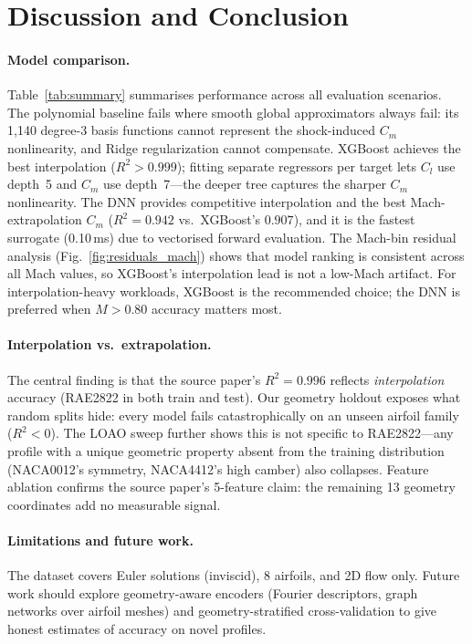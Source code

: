 \documentclass[11pt]{article}
\begin{document}
\section{Discussion and Conclusion}

\paragraph{Model comparison.}
Table~\ref{tab:summary} summarises performance across all evaluation scenarios.
The polynomial baseline fails where smooth global approximators always fail: its
1,140 degree-3 basis functions cannot represent the shock-induced $C_m$
nonlinearity, and Ridge regularization cannot compensate. XGBoost achieves the
best interpolation ($R^2>0.999$); fitting separate regressors per target lets
$C_l$ use depth~5 and $C_m$ use depth~7---the deeper tree captures the
sharper $C_m$ nonlinearity. The DNN provides competitive interpolation and the best Mach-extrapolation
$C_m$ ($R^2=0.942$ vs.\ XGBoost's $0.907$), and it is the fastest surrogate
(0.10\,ms) due to vectorised forward evaluation. The Mach-bin residual
analysis (Fig.~\ref{fig:residuals_mach}) shows that model ranking is
consistent across all Mach values, so XGBoost's interpolation lead is not a
low-Mach artifact. For interpolation-heavy workloads, XGBoost is the
recommended choice; the DNN is preferred when $M>0.80$ accuracy matters most.

\paragraph{Interpolation vs.\ extrapolation.}
The central finding is that the source paper's $R^2=0.996$ reflects
\emph{interpolation} accuracy (RAE2822 in both train and test). Our geometry
holdout exposes what random splits hide: every model fails catastrophically on
an unseen airfoil family ($R^2 < 0$). The LOAO sweep further shows this is
not specific to RAE2822---any profile with a unique geometric property absent
from the training distribution (NACA0012's symmetry, NACA4412's high camber)
also collapses. Feature ablation confirms the source paper's 5-feature claim:
the remaining 13 geometry coordinates add no measurable signal.

\paragraph{Limitations and future work.}
The dataset covers Euler solutions (inviscid), 8 airfoils, and 2D flow only.
Future work should explore geometry-aware encoders (Fourier descriptors, graph
networks over airfoil meshes) and geometry-stratified cross-validation to give
honest estimates of accuracy on novel profiles.

\clearpage


\end{document}
